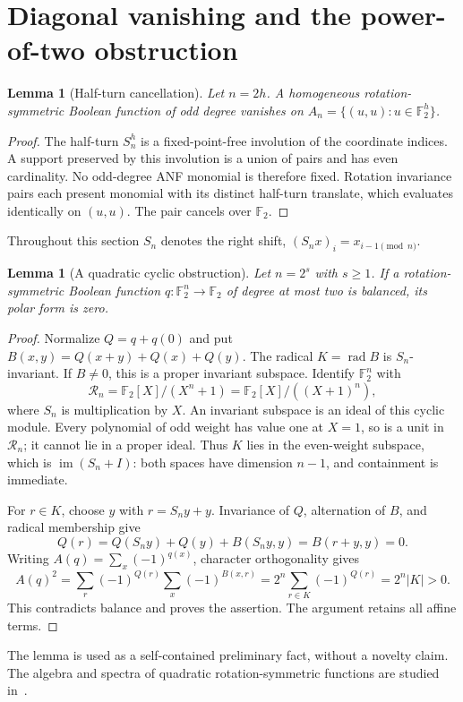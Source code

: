 \documentclass[11pt,a4paper]{article}
\newtheorem{lemma}[theorem]{Lemma}
\newcommand{\F}{\mathbb F_2}
\begin{document}
\section{Diagonal vanishing and the power-of-two obstruction}
\begin{lemma}[Half-turn cancellation]\label{lem:diagonal}
Let $n=2h$. A homogeneous rotation-symmetric Boolean function of odd degree vanishes on $A_n=\{(u,u):u\in\F^h\}$.
\end{lemma}
\begin{proof}
The half-turn $S_n^h$ is a fixed-point-free involution of the coordinate indices. A support preserved by this involution is a union of pairs and has even cardinality. No odd-degree ANF monomial is therefore fixed. Rotation invariance pairs each present monomial with its distinct half-turn translate, which evaluates identically on $(u,u)$. The pair cancels over $\F$.
\end{proof}
Throughout this section $S_n$ denotes the right shift, $(S_nx)_i=x_{i-1\pmod n}$.

\begin{lemma}[A quadratic cyclic obstruction]\label{lem:cyclicquadratic}
Let $n=2^s$ with $s\ge1$. If a rotation-symmetric Boolean function $q:\F^n\to\F$ of degree at most two is balanced, its polar form is zero.
\end{lemma}
\begin{proof}
Normalize $Q=q+q(0)$ and put $B(x,y)=Q(x+y)+Q(x)+Q(y)$. The radical $K=\operatorname{rad}B$ is $S_n$-invariant. If $B\ne0$, this is a proper invariant subspace. Identify $\F^n$ with
\[
 \mathcal R_n=\F[X]/(X^n+1)=\F[X]/((X+1)^n),
\]
where $S_n$ is multiplication by $X$. An invariant subspace is an ideal of this cyclic module. Every polynomial of odd weight has value one at $X=1$, so is a unit in $\mathcal R_n$; it cannot lie in a proper ideal. Thus $K$ lies in the even-weight subspace, which is $\operatorname{im}(S_n+I)$: both spaces have dimension $n-1$, and containment is immediate.

For $r\in K$, choose $y$ with $r=S_ny+y$. Invariance of $Q$, alternation of $B$, and radical membership give
\[
 Q(r)=Q(S_ny)+Q(y)+B(S_ny,y)
     =B(r+y,y)=0.
\]
Writing $A(q)=\sum_x(-1)^{q(x)}$, character orthogonality gives
\[
 A(q)^2=\sum_r(-1)^{Q(r)}\sum_x(-1)^{B(x,r)}
        =2^n\sum_{r\in K}(-1)^{Q(r)}=2^n|K|>0.
\]
This contradicts balance and proves the assertion. The argument retains all affine terms.
\end{proof}
The lemma is used as a self-contained preliminary fact, without a novelty claim. The algebra and spectra of quadratic rotation-symmetric functions are studied in~\cite{cc2020,cc2024}.
\end{document}
